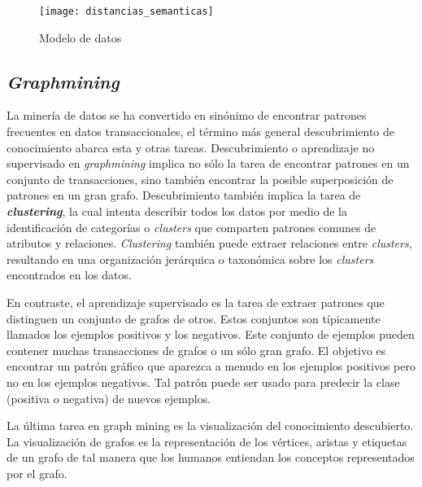 \begin{figure}[ht]
\caption{Modelo de datos}
\label{fig:distancias_semanticas}
\centering
\texttt{[image: distancias\_semanticas]}
\end{figure}


\subsection{\textit{Graphmining}}
La minería de datos se ha convertido en sinónimo de encontrar patrones frecuentes en datos transaccionales, el término más general descubrimiento de conocimiento abarca esta y otras tareas. Descubrimiento o aprendizaje no supervisado en \textit{graphmining} implica no sólo la tarea de encontrar patrones en un conjunto de transacciones, sino también encontrar la posible superposición de patrones en un gran grafo. Descubrimiento también implica la tarea de \textbf{\textit{clustering}}, la cual intenta describir todos los datos por medio de la identificación de categorías o \textit{clusters} que comparten patrones comunes de atributos y relaciones. \textit{Clustering} también puede extraer relaciones entre \textit{clusters}, resultando en una organización jerárquica o taxonómica  sobre los \textit{clusters} encontrados en los datos.\cite{Cook2006}
 
En contraste, el aprendizaje supervisado es la tarea de extraer patrones que distinguen un conjunto de grafos de otros. Estos conjuntos son típicamente llamados los ejemplos positivos y los negativos. Este conjunto de ejemplos pueden contener muchas transacciones de grafos o un sólo gran grafo. El objetivo es encontrar un patrón gráfico que aparezca a menudo en los ejemplos positivos pero no en los ejemplos negativos. Tal patrón puede ser usado para predecir la clase (positiva o negativa) de nuevos ejemplos. \cite{Cook2006}
 
La última tarea en graph mining es la visualización del conocimiento descubierto. La visualización de grafos es la representación de los vértices, aristas y etiquetas de un grafo de tal manera que los humanos entiendan los conceptos representados por el grafo.\cite{Cook2006}

